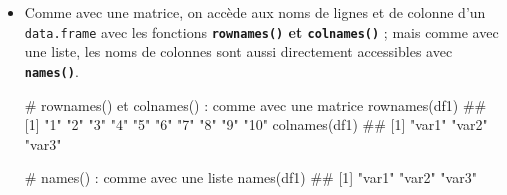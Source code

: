 \documentclass[12pt,twosided, notitlepage]{book}
\newenvironment{Shaded}{}{}
\newcommand{\KeywordTok}[1]{\textcolor[rgb]{0.00,0.00,1.00}{#1}}
\newcommand{\CommentTok}[1]{\textcolor[rgb]{0.00,0.50,0.00}{#1}}
\newcommand{\NormalTok}[1]{#1}
\renewenvironment{Shaded}{\begin{snugshade}}{\end{snugshade}}
\begin{document}
\begin{itemize}
\item
  Comme avec une matrice, on accède aux noms de lignes et de colonne
  d'un \texttt{data.frame} avec les fonctions
  \textbf{\texttt{rownames()} et
  \texttt{colnames()}}
  ; mais comme avec une liste, les noms de colonnes sont aussi
  directement accessibles avec
  \textbf{\texttt{names()}}.

\begin{Shaded}
\begin{Highlighting}[]
\CommentTok{# rownames() et colnames() : comme avec une matrice}
\KeywordTok{rownames}\NormalTok{(df1)}
\NormalTok{  ##  [1] "1"  "2"  "3"  "4"  "5"  "6"  "7"  "8"  "9"  "10"}
\KeywordTok{colnames}\NormalTok{(df1)}
\NormalTok{  ## [1] "var1" "var2" "var3"}

\CommentTok{# names() : comme avec une liste}
\KeywordTok{names}\NormalTok{(df1)}
\NormalTok{  ## [1] "var1" "var2" "var3"}
\end{Highlighting}
\end{Shaded}
\end{itemize}

~
\end{document}
